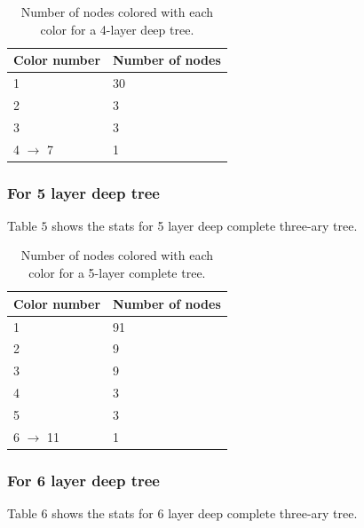 \documentclass{article}
\theoremstyle{remark}
\begin{document}
\begin{table}[h]
    \centering
    \begin{tabular}{|l|l|}
        \hline
        \textbf{Color number} & \textbf{Number of nodes} \\ \hline
        1                     & 30                                          \\ \hline
        2                     & 3                                           \\ \hline
        3                     & 3                                           \\ \hline
        4  $\to$ 7                  & 1\\ \hline
    \end{tabular}
    \caption{Number of nodes colored with each color for a 4-layer deep tree.}
    \label{tab:colors}
\end{table}

\subsubsection{For 5 layer deep tree}
Table $5$ shows the stats for 5 layer deep complete three-ary tree.

\begin{table}[h]
    \centering
    \begin{tabular}{|l|l|}
        \hline
        \textbf{Color number} & \textbf{Number of nodes} \\ \hline
        1                     & 91                                          \\ \hline
        2                     & 9                                           \\ \hline
        3                     & 9                                           \\ \hline
        4                     & 3                                           \\ \hline
        5                     & 3                                           \\ \hline
        6  $\to$ 11 & 1                                           \\ \hline
    \end{tabular}
    \caption{Number of nodes colored with each color for a 5-layer complete tree.}
    \label{tab:colors}
\end{table}

\subsubsection{For 6 layer deep tree}
Table $6$ shows the stats for 6 layer deep complete three-ary tree.
\end{document}
